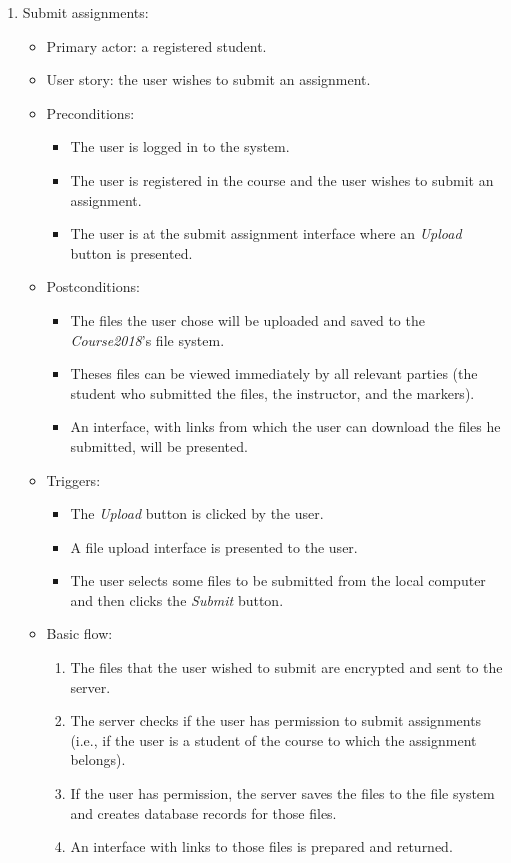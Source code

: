 \begin{enumerate}
\item Submit assignments:
\begin{itemize}
    \item Primary actor: a registered student.
    \item User story: the user wishes to submit an assignment.
    \item Preconditions:
        \begin{itemize}
            \item The user is logged in to the system.
            \item The user is registered in the course and the user wishes to
                submit an assignment.
            \item The user is at the submit assignment interface where an
                \emph{Upload} button is presented.
        \end{itemize}
    \item Postconditions:
        \begin{itemize}
            \item The files the user chose will be uploaded and saved to the
                \emph{Course2018}'s file system.
            \item Theses files can be viewed immediately by all relevant parties
                (the student who submitted the files, the instructor,
                and the markers).
            \item An interface, with links from which the user can
                download the files he submitted, will be presented.
        \end{itemize}
    \item Triggers:
        \begin{itemize}
            \item The \emph{Upload} button is clicked by the user.
            \item A file upload interface is presented to the user.
            \item The user selects some files to be submitted from the 
                local computer and then clicks the \emph{Submit} button.
        \end{itemize}
    \item Basic flow:
        \begin{enumerate}
            \item The files that the user wished to submit are encrypted and
                sent to the server.
            \item The server checks if the user has permission to submit
                assignments (i.e., if the user is a
                student of the course to which the assignment belongs).
            \item If the user has permission, the server saves the files to the
                file system and creates database records for those files.
            \item An interface with links to those files is prepared and
                returned.
        \end{enumerate}
\end{itemize}


\end{enumerate}
